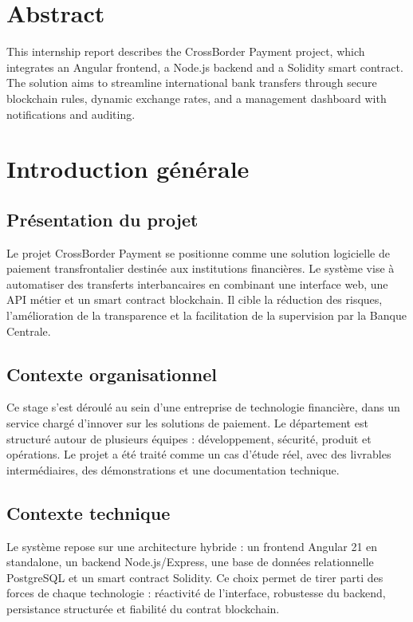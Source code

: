 \documentclass[a4paper,12pt]{report}
\begin{document}
\vfill

\cleardoublepage
\chapter*{Abstract}
This internship report describes the CrossBorder Payment project, which integrates an Angular frontend, a Node.js backend and a Solidity smart contract. The solution aims to streamline international bank transfers through secure blockchain rules, dynamic exchange rates, and a management dashboard with notifications and auditing.

\cleardoublepage
\tableofcontents
\cleardoublepage

\chapter{Introduction générale}
\section{Présentation du projet}
Le projet CrossBorder Payment se positionne comme une solution logicielle de paiement transfrontalier destinée aux institutions financières. Le système vise à automatiser des transferts interbancaires en combinant une interface web, une API métier et un smart contract blockchain. Il cible la réduction des risques, l'amélioration de la transparence et la facilitation de la supervision par la Banque Centrale.

\section{Contexte organisationnel}
Ce stage s'est déroulé au sein d'une entreprise de technologie financière, dans un service chargé d'innover sur les solutions de paiement. Le département est structuré autour de plusieurs équipes : développement, sécurité, produit et opérations. Le projet a été traité comme un cas d'étude réel, avec des livrables intermédiaires, des démonstrations et une documentation technique.

\section{Contexte technique}
Le système repose sur une architecture hybride : un frontend Angular 21 en standalone, un backend Node.js/Express, une base de données relationnelle PostgreSQL et un smart contract Solidity. Ce choix permet de tirer parti des forces de chaque technologie : réactivité de l'interface, robustesse du backend, persistance structurée et fiabilité du contrat blockchain.
\end{document}
